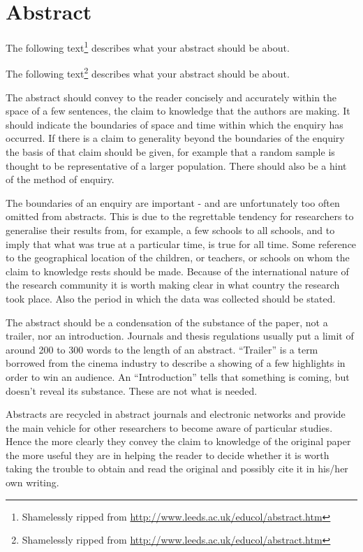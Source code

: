 \documentclass[a4paper,12pt,twoside,openany,headsepline,bibliography=totocnumbered]{scrbook}
\begin{document}


\section*{Abstract}
The following text\footnote{Shamelessly ripped from \url{http://www.leeds.ac.uk/educol/abstract.htm}} describes what your abstract should be about.

The following text\footnote{Shamelessly ripped from \url{http://www.leeds.ac.uk/educol/abstract.htm}} describes what your abstract should be about.

The abstract should convey to the reader concisely and accurately within the space of a few sentences, the claim to knowledge that the authors are making. It should indicate the boundaries of space and time within which the enquiry has occurred. If there is a claim to generality beyond the boundaries of the enquiry the basis of that claim should be given, for example that a random sample is thought to be representative of a larger population. There should also be a hint of the method of enquiry.

The boundaries of an enquiry are important - and are unfortunately too often omitted from abstracts. This is due to the regrettable tendency for researchers to generalise their results from, for example, a few schools to all schools, and to imply that what was true at a particular time, is true for all time. Some reference to the geographical location of the children, or teachers, or schools on whom the claim to knowledge rests should be made. Because of the international nature of the research community it is worth making clear in what country the research took place. Also the period in which the data was collected should be stated.

The abstract should be a condensation of the substance of the paper, not a trailer, nor an introduction. Journals and thesis regulations usually put a limit of around 200 to 300 words to the length of an abstract. “Trailer” is a term borrowed from the cinema industry to describe a showing of a few highlights in order to win an audience. An “Introduction” tells that something is coming, but doesn’t reveal its substance. These are not what is needed.

Abstracts are recycled in abstract journals and electronic networks and provide the main vehicle for other researchers to become aware of particular studies. Hence the more clearly they convey the claim to knowledge of the original paper the more useful they are in helping the reader to decide whether it is worth taking the trouble to obtain and read the original and possibly cite it in his/her own writing.
\end{document}
